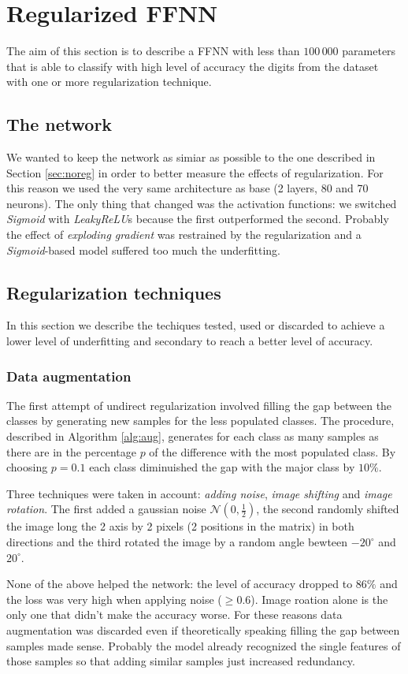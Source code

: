 \documentclass[compsoc]{IEEEtran}
\begin{document}
\section{Regularized FFNN}
The aim of this section is to describe a FFNN with less than $100\,000$ parameters that is able to classify
with high level of accuracy the digits from the dataset with one or more regularization technique. 

\subsection{The network}
We wanted to keep the network as simiar as possible to the one described in Section \ref{sec:noreg} in order to better measure the effects of regularization.
For this reason we used the very same architecture as base (2 layers, 80 and 70 neurons).
The only thing that changed was the activation functions: we switched \emph{Sigmoid} with \emph{LeakyReLU}s because the first outperformed the second. Probably the effect of \emph{exploding gradient} was restrained by the regularization and a \emph{Sigmoid}-based model suffered too much the underfitting.


\subsection{Regularization techniques}\label{sec:reg}
In this section we describe the techiques tested, used or discarded to achieve a lower level of underfitting and secondary to reach a better level of accuracy.

\subsubsection{Data augmentation}
The first attempt of undirect regularization involved filling the gap between the classes by generating new samples for the less populated classes. The procedure, described in Algorithm \ref{alg:aug}, generates for each class as many samples as there are in the percentage $p$ of the difference with the most populated class.
By choosing $p=0.1$ each class diminuished the gap with the major class by $10\%$. \par
Three techniques were taken in account: \emph{adding noise}, \emph{image shifting} and \emph{image rotation}. The first added a gaussian noise $\mathcal{N}(0, \frac{1}{2})$, the second randomly shifted the image long the 2 axis by 2 pixels (2 positions in the matrix) in both directions and the third rotated the image by a random angle bewteen $-20^{\circ}$ and $20^{\circ}$. \par
None of the above helped the network: the level of accuracy dropped to $86\%$ and the loss was very high when applying noise ($\geq 0.6$). Image roation alone is the only one that didn't make the accuracy worse. For these reasons data augmentation was discarded even if theoretically speaking filling the gap between samples made sense. Probably the model already recognized the single features of those samples so that adding similar samples just increased redundancy.
\end{document}
